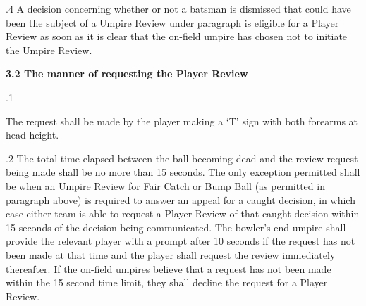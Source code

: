 \documentclass[12pt]{article}
\begin{document}
\vspace{\baselineskip}
\begin{adjustwidth}{0.5in}{0.1in}
\begin{justify}
{\fontsize{9pt}{10.8pt}.4 \tabto{0.49in} A decision concerning whether or not a batsman is dismissed that could have been the subject of a Umpire Review under paragraph is eligible for a Player Review as soon as it is clear that the on-field umpire has chosen not to initiate the Umpire Review.\par}
\end{justify}\par

\end{adjustwidth}


\vspace{\baselineskip}
{\fontsize{11pt}{13.2pt}\selectfont \textbf{3.2 \tabto{0.47in} The manner of requesting the Player Review}\par}\par


\vspace{\baselineskip}
{\fontsize{9pt}{10.8pt}.1 \tabto{0.49in} {\fontsize{8pt}{9.6pt}\selectfont The request shall be made by the player making a ‘T’ sign with both forearms at head height.\par}\par}\par


\vspace{\baselineskip}
\begin{adjustwidth}{0.5in}{0.06in}
{\fontsize{9pt}{10.8pt}.2 \tabto{0.49in} The total time elapsed between the ball becoming dead and the review request being made shall be no more than 15 seconds. The only exception permitted shall be when an Umpire Review for Fair Catch or Bump Ball (as permitted in paragraph above) is required to answer an appeal for a caught decision, in which case either team is able to request a Player Review of that caught decision within 15 seconds of the decision being communicated. The bowler’s end umpire shall provide the relevant player with a prompt after 10 seconds if the request has not been made at that time and the player shall request the review immediately thereafter. If the on-field umpires believe that a request has not been made within the 15 second time limit, they shall decline the request for a Player Review.\par}\par

\end{adjustwidth}
\end{document}
